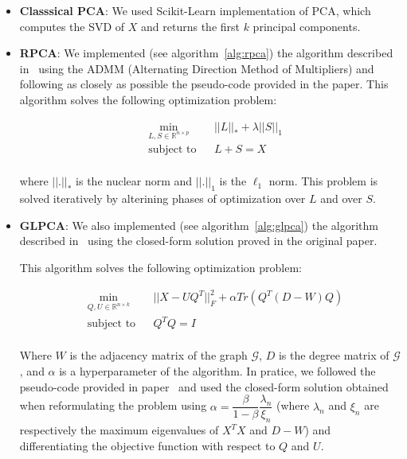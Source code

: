 \documentclass[sigconf]{acmart}
\begin{document}
\begin{itemize}
  \item \textbf{Classsical PCA}: We used Scikit-Learn implementation of PCA, which computes the SVD of $X$ and returns the first $k$ principal components.
  \item \textbf{RPCA}: We implemented (see algorithm~\ref{alg:rpca}) the algorithm described in~\cite{rpca_paper} using the ADMM (Alternating Direction Method of Multipliers) and following as closely as possible the pseudo-code provided in the paper.
  This algorithm solves the following optimization problem:

  \begin{equation*}
    \begin{aligned}
    & \underset{L, S \in \mathbb{R}^{n \times p}}{\min}
    & & ||L||_* + \lambda ||S||_1 \\
    & \text{subject to}
    & & L + S = X \\
    \end{aligned}
  \end{equation*}

  where $||.||_*$ is the nuclear norm and $||.||_1$ is the $\ell_1$ norm. This problem is solved iteratively by alterining phases of optimization over $L$ and over $S$.
  
  \item \textbf{GLPCA}: We also implemented (see algorithm~\ref{alg:glpca}) the algorithm described in~\cite{glpca_paper} using the closed-form solution proved in the original paper.
  
  This algorithm solves the following optimization problem:

  \begin{equation*}
    \begin{aligned}
    & \underset{Q, U \in \mathbb{R}^{n \times k}}{\min}
    & & ||X - UQ^T||_F^2 + \alpha Tr(Q^T (D-W) Q) \\
    & \text{subject to}
    & & Q^TQ = I \\
    \end{aligned}
  \end{equation*}

  Where $W$ is the adjacency matrix of the graph $\mathcal{G}$, $D$ is the degree matrix of $\mathcal{G}$, and $\alpha$ is a hyperparameter of the algorithm. In pratice, we followed the pseudo-code provided in paper~\cite{glpca_paper} and used the closed-form solution obtained when reformulating the problem using $\alpha = \dfrac{\beta}{1 - \beta} \dfrac{\lambda_n}{\xi_n}$ (where $\lambda_n$ and $\xi_n$ are respectively the maximum eigenvalues of $X^TX$ and $D-W$) and differentiating the objective function with respect to $Q$ and $U$.


\end{itemize}
\end{document}
